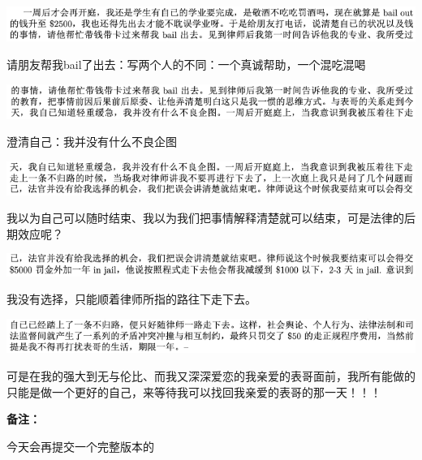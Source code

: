 \documentclass[9pt, b5paper]{article}
\begin{document}
\begin{center}
\includegraphics[width=.9\linewidth]{./pic/backups_plans_20210506_085736.png}
\end{center}

请朋友帮我bail了出去：写两个人的不同：一个真诚帮助，一个混吃混喝

\begin{center}
\includegraphics[width=.9\linewidth]{./pic/backups_plans_20210506_085817.png}
\end{center}

澄清自己：我并没有什么不良企图

\begin{center}
\includegraphics[width=.9\linewidth]{./pic/backups_plans_20210506_085853.png}
\end{center}

我以为自己可以随时结束、我以为我们把事情解释清楚就可以结束，可是法律的后期效应呢？

\begin{center}
\includegraphics[width=.9\linewidth]{./pic/backups_plans_20210506_085944.png}
\end{center}

我没有选择，只能顺着律师所指的路往下走下去。 

\begin{center}
\includegraphics[width=.9\linewidth]{./pic/backups_plans_20210506_090008.png}
\end{center}

可是在我的强大到无与伦比、而我又深深爱恋的我亲爱的表哥面前，我所有能做的只能是做一个更好的自己，来等待我可以找回我亲爱的表哥的那一天！！！

\textbf{备注：}

今天会再提交一个完整版本的
\end{document}
